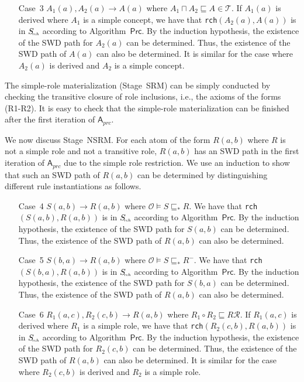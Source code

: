 \begin{enumerate}[leftmargin=12ex]
\item[Case~3] $A_1(a),A_2(a)\rightarrow A(a)$ where $A_1\sqcap A_2\sqsubseteq A\in\mathcal{T}$.
    If $A_1(a)$ is derived where $A_1$ is a simple concept,
    we have that \texttt{rch}$(A_2(a),A(a))$ is in $S_{\textit{\!\tiny rch}}$
    according to Algorithm~$\mathsf{Prc}$.
    By the induction hypothesis, the existence of the SWD path for $A_2(a)$ can be determined.
    Thus, the existence of the SWD path of $A(a)$ can also be determined.
    It is similar for the case where $A_2(a)$ is derived and $A_2$ is a simple concept.
\end{enumerate}

The simple-role materialization (Stage~SRM) can be simply conducted by checking the transitive closure
of role inclusions, i.e., the axioms of the forms (R1-R2).
It is easy to check that the simple-role materialization can be finished after the
first iteration of $\mathsf{A}_{prc}$.

We now discuss Stage~NSRM. For each atom of the form $R(a,b)$ where $R$ is not a simple role
and not a transitive role,
$R(a,b)$ has an SWD path in the first iteration of $\mathsf{A}_{prc}$ due to the simple role restriction.
We use an induction to show that
such an SWD path of $R(a,b)$ can be determined by distinguishing different rule instantiations
as follows.

\begin{enumerate}[leftmargin=12ex]
\item[Case~4] $S(a,b)\rightarrow R(a,b)$ where $\mathcal{O}\models S\sqsubseteq_* R$.
    We have that \texttt{rch}$(S(a,b),R(a,b))$ is in $S_{\textit{\!\tiny rch}}$
    according to Algorithm~$\mathsf{Prc}$.
    By the induction hypothesis, the existence of the SWD path for $S(a,b)$ can be determined.
    Thus, the existence of the SWD path of $R(a,b)$ can also be determined.

\item[Case~5] $S(b,a)\rightarrow R(a,b)$ where $\mathcal{O}\models S\sqsubseteq_* R^-$.
    We have that \texttt{rch}$(S(b,a),R(a,b))$ is in $S_{\textit{\!\tiny rch}}$
    according to Algorithm~$\mathsf{Prc}$.
    By the induction hypothesis, the existence of the SWD path for $S(b,a)$ can be determined.
    Thus, the existence of the SWD path of $R(a,b)$ can also be determined.

\item[Case~6] $R_1(a,c),R_2(c,b)\rightarrow R(a,b)$ where $R_1\circ R_2\sqsubseteq R\mathcal{R}$.
    If $R_1(a,c)$ is derived where $R_1$ is a simple role,
    we have that \texttt{rch}$(R_2(c,b),R(a,b))$ is in $S_{\textit{\!\tiny rch}}$
    according to Algorithm~$\mathsf{Prc}$.
    By the induction hypothesis, the existence of the SWD path for $R_2(c,b)$ can be determined.
    Thus, the existence of the SWD path of $R(a,b)$ can also be determined.
    It is similar for the case where $R_2(c,b)$ is derived and $R_2$ is a simple role.
\end{enumerate}

